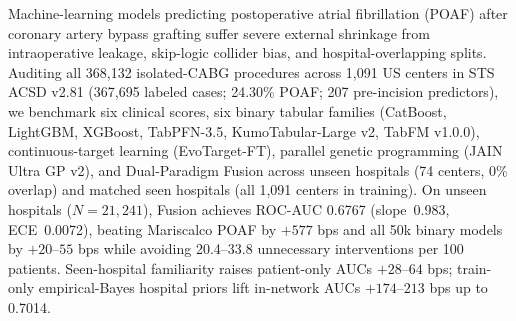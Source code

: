 \begin{natabstract}
Machine-learning models predicting postoperative atrial fibrillation (POAF) after coronary artery bypass grafting suffer severe external shrinkage from intraoperative leakage, skip-logic collider bias, and hospital-overlapping splits. Auditing all 368,132 isolated-CABG procedures across 1,091 US centers in STS ACSD v2.81 (367,695 labeled cases; 24.30\% POAF; 207 pre-incision predictors), we benchmark six clinical scores, six binary tabular families (CatBoost, LightGBM, XGBoost, TabPFN-3.5, KumoTabular-Large v2, TabFM v1.0.0), continuous-target learning (EvoTarget-FT), parallel genetic programming (JAIN Ultra GP v2), and Dual-Paradigm Fusion across unseen hospitals (74 centers, 0\% overlap) and matched seen hospitals (all 1,091 centers in training). On unseen hospitals ($N=21{,}241$), Fusion achieves ROC-AUC 0.6767 (slope~0.983, ECE~0.0072), beating Mariscalco POAF by $+577$ bps and all 50k binary models by $+20$--$55$ bps while avoiding 20.4--33.8 unnecessary interventions per 100 patients. Seen-hospital familiarity raises patient-only AUCs $+28$--$64$ bps; train-only empirical-Bayes hospital priors lift in-network AUCs $+174$--$213$ bps up to 0.7014.
\end{natabstract}
